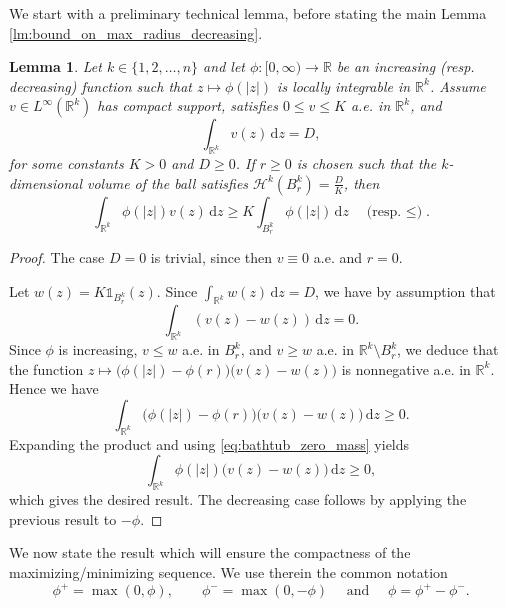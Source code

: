 \documentclass[10pt,leqno]{amsart}
\newcommand{\R}[0]{\mathbb{R}}
\newcommand{\dd}{\, \mathrm{d}}
\newcommand{\one}{\mathds{1}}
\numberwithin{Theorem}{section}
\newtheorem{Lemma}[Theorem]{Lemma}
\theoremstyle{definition}
\theoremstyle{remark}
\numberwithin{equation}{section}
\numberwithin{equation}{section}
\begin{document}
We start with a preliminary technical lemma, before stating the main Lemma \ref{lm:bound_on_max_radius_decreasing}.

\begin{Lemma}\label{lm:bathtub_principle}
    Let $k \in \{1, 2, \dots, n\}$ and let $\phi: [0, \infty) \to \R$ be an increasing (resp. decreasing) function such that $z \mapsto \phi(|z|)$ is locally integrable in $\R^k$. Assume $v \in L^{\infty}(\R^k)$ has compact support, satisfies $0 \leq v \leq K$ a.e. in $\R^k$, and
    $$
    \int_{\R^k} v(z) \dd z = D,
    $$
    for some constants $K>0$ and $D\geq 0$. If $r\geq0$ is chosen such that the $k$-dimensional volume of the ball satisfies $\mathcal{H}^k(B_r^k) = \frac{D}{K}$, then
    \begin{equation}
        \int_{\R^k} \phi(|z|) v(z) \dd z \geq K \int_{B_r^k} \phi(|z|) \dd z \quad \text{(resp. $\leq$)}.
    \end{equation}
\end{Lemma} 

\begin{proof}
    The case $D=0$ is trivial, since then $v \equiv 0$ a.e. and $r=0$.  

    Let $w(z)=K\one_{B_r^k}(z)$. Since $\int_{\R^k} w(z) \dd z = D$, we have by assumption that
    \begin{equation}\label{eq:bathtub_zero_mass}
        \int_{\R^k} (v(z)-w(z)) \dd z = 0.
    \end{equation}
     Since $\phi$ is increasing, $v \leq w$ a.e. in $B_r^k$, and $v \geq w$ a.e. in $\R^k \setminus B_r^k$, we deduce that the function $z \mapsto \big(\phi(|z|) - \phi(r)\big) \big(v(z) - w(z)\big)$ is nonnegative a.e.  in $\R^k$.  Hence we have 
\begin{equation*}\label{eq:bathtub_positive_integral}
        \int_{\R^k} \big(\phi(|z|) - \phi(r)\big) \big(v(z) - w(z)\big) \dd z \geq 0.
    \end{equation*}
  Expanding the product and using \eqref{eq:bathtub_zero_mass} yields
    $$
    \int_{\R^k} \phi(|z|) \big(v(z) - w(z)\big) \dd z \geq 0,
    $$
    which gives the desired result.
    The decreasing case follows by applying the previous result to $-\phi$.
\end{proof}



We now state the result which will ensure the compactness of the maximizing/minimizing sequence. We use therein the common notation 
$$
  \phi^+=\max (0,\phi),\quad\quad \phi^-=\max(0,-\phi)\quad\text{ and }\quad \phi=\phi^+-\phi^-.
$$
\end{document}
